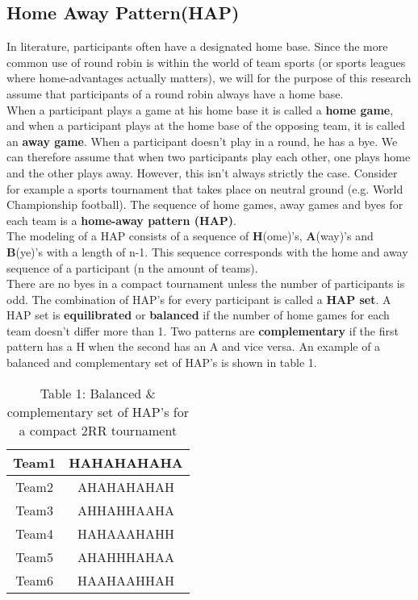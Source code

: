 \subsection{Home Away Pattern(HAP)}
In literature, participants often have a designated home base. Since the more common use of round robin is within the world of team sports (or sports leagues where home-advantages actually matters), we will for the purpose of this research assume that participants of a round robin always have a home base.
\\[5px]
When a participant plays a game at his home base it is called a \textbf{home game}, and when a participant plays at the home base of the opposing team, it is called an \textbf{away game}. When a participant doesn’t play in a round, he has a bye. We can therefore assume that when two participants play each other, one plays home and the other plays away. However, this isn’t always strictly the case. Consider for example a sports tournament that takes place on neutral ground (e.g. World Championship football). The sequence of home games, away games and byes for each team is a \textbf{home-away pattern (HAP)}.
\\[5px]
The modeling of a HAP consists of a sequence of \textbf{H}(ome)’s, \textbf{A}(way)’s and \textbf{B}(ye)’s with a length of n-1. This sequence corresponds with the home and away sequence of a participant (n the amount of teams).
\\[5px]
There are no byes in a compact tournament unless the number of participants is odd.  The combination of HAP’s for every participant is called a \textbf{HAP set}. A HAP set is \textbf{equilibrated} or \textbf{balanced} if the number of home games for each team doesn’t differ more than 1. Two patterns are \textbf{complementary} if the first pattern has a H when the second has an A and vice versa. An example of a balanced and complementary set of HAP’s is shown in table 1.

\begin{table}[h]
\centering
\begin{tabular}{|c|c|}
 \hline
 Team1 & HAHAHAHAHA \\ 
 \hline 
 Team2 & AHAHAHAHAH \\
 \hline
 Team3 & AHHAHHAAHA \\
 \hline
 Team4 & HAHAAAHAHH \\
 \hline
 Team5 & AHAHHHAHAA \\
 \hline
 Team6 & HAAHAAHHAH \\
 \hline
\end{tabular}
\caption{Table 1: Balanced \& complementary set of HAP’s for a compact 2RR tournament}
\end{table}

